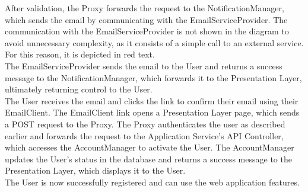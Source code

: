 After validation, the Proxy forwards the request to the NotificationManager, which sends the email by communicating with the EmailServiceProvider. The communication with the EmailServiceProvider is not shown in the diagram to avoid unnecessary complexity, as it consists of a simple call to an external service. For this reason, it is depicted in red text.\\
The EmailServiceProvider sends the email to the User and returns a success message to the NotificationManager, which forwards it to the Presentation Layer, ultimately returning control to the User.\\
The User receives the email and clicks the link to confirm their email using their EmailClient. The EmailClient link opens a Presentation Layer page, which sends a POST request to the Proxy. The Proxy authenticates the user as described earlier and forwards the request to the Application Service's API Controller, which accesses the AccountManager to activate the User. The AccountManager updates the User's status in the database and returns a success message to the Presentation Layer, which displays it to the User.\\
The User is now successfully registered and can use the web application features.

